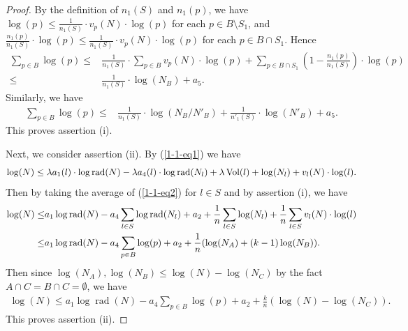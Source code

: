 \documentclass[10pt,a4paper]{amsart}
\DeclareMathOperator{\Vol}{\text{Vol}}
\DeclareMathOperator{\rad}{\text{rad}}
\begin{document}
\begin{proof}
By the definition of $n_1(S)$ and $n_1(p)$, we have $\log(p) \le \frac{1}{n_1(S)}\cdot v_p(N)\cdot\log(p)$ for each $p\in B\setminus S_1$, and $\frac{n_1(p)}{n_1(S)} \cdot \log(p) \le \frac{1}{n_1(S)}\cdot v_p(N)\cdot\log(p)$ for each $p\in B\cap S_1$. Hence
\small\begin{align*}
\sum_{p\in B} \log(p) \le & \frac{1}{n_1(S)} \cdot \sum_{p\in B} v_p(N)\cdot\log(p) + \sum_{p\in B\cap S_1}  (1-\frac{n_1(p)}{n_1(S)})\cdot\log(p)
 \\ \le & \frac{1}{n_1(S)} \cdot \log(N_B) + a_5 .
\end{align*}\normalsize
Similarly, we have
\small\begin{align*}
\sum_{p\in B} \log(p)   \le & \frac{1}{n_1(S)} \cdot \log(N_B/N'_B) + \frac{1}{n'_1(S)} \cdot \log(N'_B) + a_5 .
\end{align*}\normalsize
This proves assertion (i).

Next, we consider assertion (ii). 
By  (\ref{1-1-eq1}) we have 
\begin{equation} \small
\begin{aligned} \label{1-1-eq2}
\log(N) \le \lambda a_1(l)\cdot \log\rad(N) - \lambda a_4(l) \cdot \log\rad(N_l)  
 + \lambda \Vol(l)  + \log(N_l) + v_l(N) \cdot \log(l) .
\end{aligned}
\end{equation}
Then by taking the average of (\ref{1-1-eq2}) for $l\in S$ and by assertion (i), we have
\begin{equation*} \small
\begin{aligned} 
\log(N) \le &  a_1 \log\rad(N) - a_4  \sum_{l\in S}\log\rad(N_l)  + a_2 
+ \frac{1}{n}\sum_{l\in S}\log(N_l)  + \frac{1}{n}\sum_{l\in S} v_l(N) \cdot \log(l) 
\\ \le &  a_1 \log\rad(N) - a_4  \sum_{p\in B}\log(p)  + a_2 + \frac{1}{n}(\log(N_A)+(k-1)\log(N_B) ).
\end{aligned}
\end{equation*}
Then since $\log(N_A), \log(N_B) \le \log(N) - \log(N_C)$ by the fact $A\cap C = B \cap C =\emptyset$, we have 
\small\begin{align*}
   \log(N) \le a_1 \log\rad(N) - a_4  \sum_{p\in B}\log(p) + a_2 + \frac{k}{n}(\log(N) - \log(N_C)).
\end{align*}\normalsize
This proves assertion (ii).


\end{proof}
\end{document}

